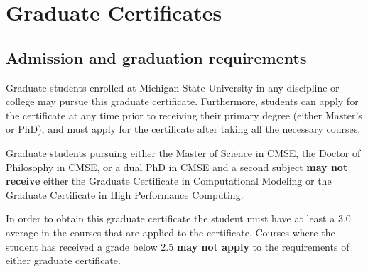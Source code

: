 \section{Graduate Certificates}
\label{sec:grad_certs}

\subsection{Admission and graduation requirements}
\label{sec:cert_requirements}

Graduate students enrolled at Michigan State University in any
discipline or college may pursue this graduate certificate.
Furthermore, students can apply for the certificate at any time prior
to receiving their primary degree (either Master’s or PhD), and must
apply for the certificate after taking all the necessary courses.

Graduate students pursuing either the Master of Science in CMSE, the
Doctor of Philosophy in CMSE, or a dual PhD in CMSE and a second
subject \textbf{may not  receive} either the Graduate Certificate in
Computational Modeling or the Graduate Certificate in High Performance
Computing.

In order to obtain this graduate certificate the student must have at
least a 3.0 average in the courses that are applied to the
certificate.  Courses where the student has received a grade below 2.5
\textbf{may not apply} to the requirements of either graduate
certificate.





